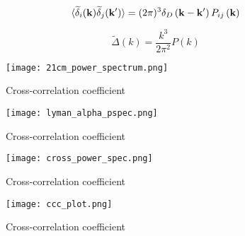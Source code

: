 \begin{equation}
\langle \widetilde{\delta}_i ({\bf k}) \widetilde{\delta}_j ({\bf k'}) \rangle = (2 \pi) ^3 \delta_D \left( {\bf k} - {\bf k'} \right) P_{ij} \left({\bf k} \right)
\end{equation}

\begin{equation}
    \widetilde{\Delta} \left( k \right) = \frac{k^3}{2 \pi ^2} P \left( k \right)
\end{equation}

\begin{figure}[ht]
	\centering
	\texttt{[image: 21cm\_power\_spectrum.png]}
	\caption[21cm Power Spectrum]{Cross-correlation coefficient}
	\label{fig:21cm_ps}
\end{figure}

\begin{figure}[ht]
	\centering
	\texttt{[image: lyman\_alpha\_pspec.png]}
	\caption[Ly$\alpha$ Power Spectrum]{Cross-correlation coefficient}
	\label{fig:lya_ps}
\end{figure}

\begin{figure}[ht]
	\centering
	\texttt{[image: cross\_power\_spec.png]}
	\caption[Cross-Power Spectrum]{Cross-correlation coefficient}
	\label{fig:x_ps}
\end{figure}

\begin{figure}[ht]
	\centering
	\texttt{[image: ccc\_plot.png]}
	\caption[Cross-Correlation Coefficient]{Cross-correlation coefficient}
	\label{fig:ccc}
\end{figure}
